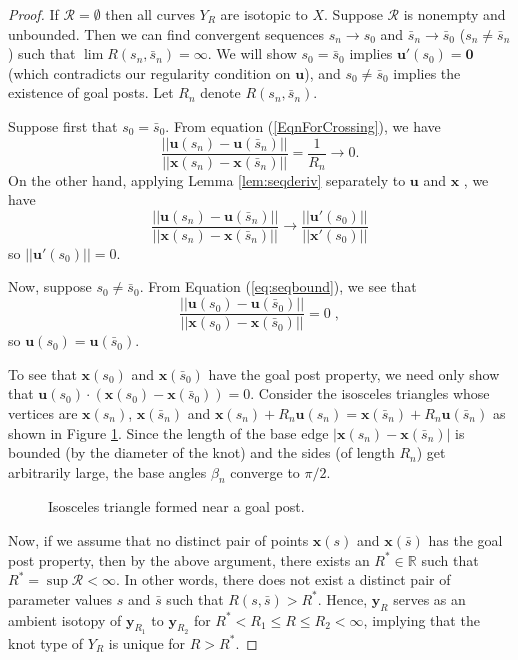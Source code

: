 \documentclass[12pt]{article}
\numberwithin{equation}{subsection}
\theoremstyle{definition}
\numberwithin{lem}{section}
\def\v{\vspace{0.1in}}
\def\vecu{\mathbf{u}}
\def\vecx{\mathbf{x}}
\begin{document}
\begin{proof} If $\mathcal{R}=\emptyset$ then all curves $Y_R$ are isotopic to $X$.
Suppose $\mathcal{R}$ is nonempty and unbounded. Then we can find convergent sequences $s_n \to s_0$ and $\bar{s}_n \to \bar{s}_0$ ($s_n \neq \bar{s}_n$) such that $\lim R(s_n, \bar{s}_n) = \infty$. We will show  $s_0 = \bar{s}_0$ implies $\vecu'(s_0)=\mathbf{0}$ (which contradicts our regularity condition on $\vecu$), and $s_0 \neq \bar{s}_0$ implies the existence of goal posts. Let $R_n$ denote $R(s_n, \bar{s}_n)$.

Suppose first that $s_0 = \bar{s}_0$.
From equation (\ref{EqnForCrossing}), we have
\begin{equation}
\label{eq:seqbound}
\frac{||\mathbf{u}(s_n) - \mathbf{u}(\bar{s}_n)||}{||\mathbf{x}(s_n) - \mathbf{x}(\bar{s}_n)||} = \frac{1}{R_n} \longrightarrow 0.
\end{equation}
On the other hand, applying Lemma \ref{lem:seqderiv} separately to $\vecu$ and $\vecx$ , we have
\begin{equation}
\frac{||\mathbf{u}(s_n) - \mathbf{u}(\bar{s}_n)||}{||\mathbf{x}(s_n) - \mathbf{x}(\bar{s}_n)||} \longrightarrow \frac{||\vecu'(s_0)||  }{||\vecx'(s_0)||} \end{equation}
so $||\vecu'(s_0)||=0$.

\v
Now, suppose $s_0 \neq \bar{s}_0$.  From Equation (\ref{eq:seqbound}), we see that
$$\frac{||\mathbf{u}(s_0) - \mathbf{u}(\bar{s}_0)||}{||\mathbf{x}(s_0) - \mathbf{x}(\bar{s}_0)||} = 0\;,$$
so $\mathbf{u}(s_0) = \mathbf{u}(\bar{s}_0)$.

To see that $\mathbf{x}(s_0)$ and $\mathbf{x}(\bar{s}_0)$ have the goal post property, we need only show that $\mathbf{u}(s_0) \cdot (\mathbf{x}(s_0) - \mathbf{x}(\bar{s}_0)) = 0$.  Consider the isosceles triangles whose vertices are $\mathbf{x}(s_n)$, $\mathbf{x}(\bar{s}_n)$ and $\mathbf{x}(s_n) + R_n\mathbf{u}(s_n) = \mathbf{x}(\bar{s}_n) + R_n \mathbf{u}(\bar{s}_n)$ as shown in Figure \ref{fig:isotris}. Since the length of the base edge $|\mathbf{x}(s_n) - \mathbf{x}(\bar{s}_n)|$ is bounded (by the diameter of the knot) and the sides (of length $R_n$) get arbitrarily large, the  base angles $\beta_n$ converge to $\pi/2$. 

\begin{figure}[H]
\begin{center}
\tikzset{font=\scriptsize}

\end{center}
\caption{Isosceles triangle formed near a goal post.}
\label{fig:isotris}
\end{figure}

Now, if we assume that no distinct pair of points $\mathbf{x}(s)$ and $\mathbf{x}(\bar{s})$ has the goal post property, then by the above argument, there exists an $R^* \in \mathbb{R}$ such that $R^* = \mathop{sup} \mathcal{R}< \infty.$  In other words, there does not exist a distinct pair of parameter values $s$ and $\bar{s}$ such that $R(s,\bar{s}) > R^*$.  Hence, $\mathbf{y}_R$ serves as an ambient isotopy of $\mathbf{y}_{R_1}$ to $\mathbf{y}_{R_2}$ for $R^* < R_1 \leq R \leq R_2 < \infty$, implying that the knot type of $Y_{R}$ is unique for $R > R^*$.
\end{proof}
\end{document}
